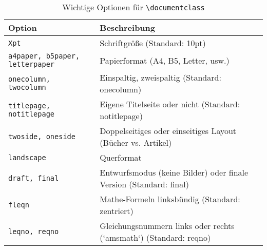 \begin{table}[H]
    \centering
    \begin{tabular}{ll}
        \toprule
        \textbf{Option}                        & \textbf{Beschreibung}                                              \\
        \midrule
        \texttt{Xpt}                           & Schriftgröße (Standard: 10pt)                                      \\
        \texttt{a4paper, b5paper, letterpaper} & Papierformat (A4, B5, Letter, usw.)                                \\
        \texttt{onecolumn, twocolumn}          & Einspaltig, zweispaltig (Standard: onecolumn)                      \\
        \texttt{titlepage, notitlepage}        & Eigene Titelseite oder nicht    (Standard: notitlepage)            \\
        \texttt{twoside, oneside}              & Doppelseitiges oder einseitiges Layout (Bücher vs. Artikel)        \\
        \texttt{landscape}                     & Querformat                                                         \\
        \texttt{draft, final}                  & Entwurfsmodus (keine Bilder) oder finale Version (Standard: final) \\
        \texttt{fleqn}                         & Mathe-Formeln linksbündig (Standard: zentriert)                    \\
        \texttt{leqno, reqno}                  & Gleichungsnummern links oder rechts (`amsmath`) (Standard: reqno)  \\
        \bottomrule
    \end{tabular}
    \caption{Wichtige Optionen für \texttt{\textbackslash documentclass}}
    \label{tab:documentclass-options}
\end{table}